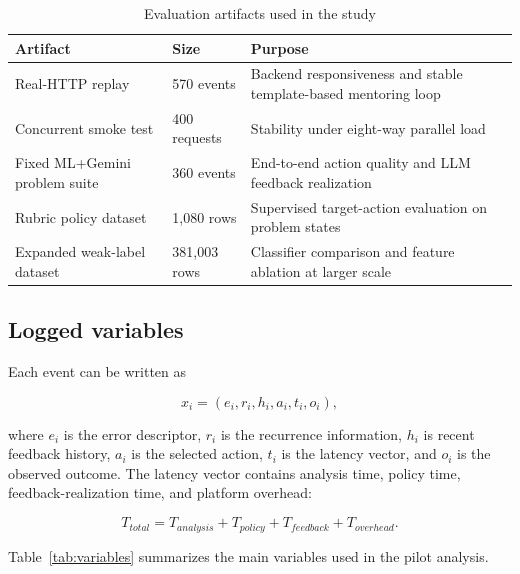 \documentclass[11pt]{article}
\begin{document}
\begin{table}[htbp]
\centering
\caption{Evaluation artifacts used in the study}
\label{tab:evaluation_artifacts}
\small
\renewcommand{\arraystretch}{1.15}
\begin{tabular}{p{} p{} p{}}
\toprule
\textbf{Artifact} & \textbf{Size} & \textbf{Purpose} \\
\midrule
Real-HTTP replay & 570 events & Backend responsiveness and stable template-based mentoring loop \\
Concurrent smoke test & 400 requests & Stability under eight-way parallel load \\
Fixed ML+Gemini problem suite & 360 events & End-to-end action quality and LLM feedback realization \\
Rubric policy dataset & 1,080 rows & Supervised target-action evaluation on problem states \\
Expanded weak-label dataset & 381,003 rows & Classifier comparison and feature ablation at larger scale \\
\bottomrule
\end{tabular}
\end{table}

\subsection{Logged variables}

Each event can be written as

\[
x_i = (e_i, r_i, h_i, a_i, t_i, o_i),
\]

where $e_i$ is the error descriptor, $r_i$ is the recurrence information, $h_i$ is recent feedback history, $a_i$ is the selected action, $t_i$ is the latency vector, and $o_i$ is the observed outcome. The latency vector contains analysis time, policy time, feedback-realization time, and platform overhead:

\[
T_{total}=T_{analysis}+T_{policy}+T_{feedback}+T_{overhead}.
\]

Table~\ref{tab:variables} summarizes the main variables used in the pilot analysis.
\end{document}
